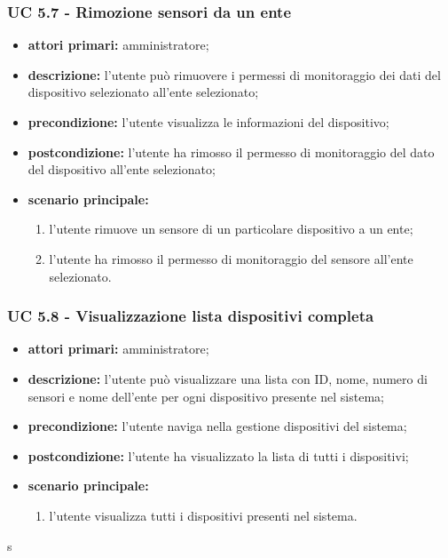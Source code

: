 			\subsubsection{UC 5.7 - Rimozione sensori da un ente}
			\begin{itemize}
				\item \textbf{attori primari:} amministratore;
				\item \textbf{descrizione:} l'utente può rimuovere i permessi di monitoraggio dei dati del dispositivo selezionato all'ente selezionato;
				\item \textbf{precondizione:} l'utente visualizza le informazioni del dispositivo;
				\item \textbf{postcondizione:} l'utente ha rimosso il permesso di monitoraggio del dato del dispositivo all'ente selezionato;
				\item \textbf{scenario principale:}
				\begin{enumerate}
					\item{l'utente rimuove un sensore di un particolare dispositivo a un ente;}
					\item{l'utente ha rimosso il permesso di monitoraggio del sensore all'ente selezionato.}
				\end{enumerate}
			\end{itemize}

			\subsubsection{UC 5.8 - Visualizzazione lista dispositivi completa}
			\begin{itemize}
				\item \textbf{attori primari:} amministratore;
				\item \textbf{descrizione:} l'utente può visualizzare una lista con ID, nome, numero di sensori e nome dell'ente per ogni dispositivo presente nel sistema;
				\item \textbf{precondizione:} l'utente naviga nella gestione dispositivi del sistema;
				\item \textbf{postcondizione:} l'utente ha visualizzato la lista di tutti i dispositivi;
				\item \textbf{scenario principale:}
				\begin{enumerate}
					\item{l'utente visualizza tutti i dispositivi presenti nel sistema.}
				\end{enumerate}
			\end{itemize}

			s
